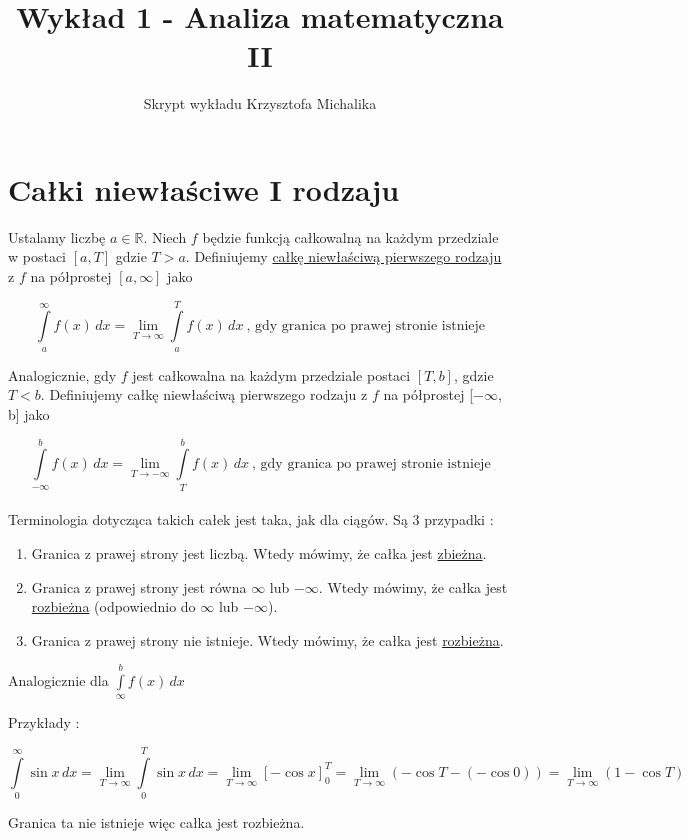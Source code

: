 \documentclass[12pt]{article}
\author{Skrypt wykładu Krzysztofa Michalika}
\title{Wykład 1 - Analiza matematyczna II}
\begin{document}
\maketitle

\section{Całki niewłaściwe I rodzaju}

Ustalamy liczbę $a \in \mathbb{R}$. Niech $f$ będzie funkcją całkowalną na każdym przedziale \linebreak w postaci $[a, T]$
gdzie $T > a$. Definiujemy \underline{całkę niewłaściwą pierwszego rodzaju} z $f$ na półprostej $[a, \infty]$ jako

$$ \int\limits_{a}^{\infty} f(x) \,dx = \lim_{T \to \infty} \int\limits_{a}^{T} f(x) \,dx \ \text{,  gdy granica po prawej stronie istnieje} $$

Analogicznie, gdy $f$ jest całkowalna na każdym przedziale postaci $[T, b]$, gdzie $T < b$. Definiujemy całkę niewłaściwą
pierwszego rodzaju z $f$ na półprostej [$-\infty$, b] jako

$$ \int\limits_{-\infty}^{b} f(x) \,dx = \lim_{T \to -\infty} \int\limits_{T}^{b} f(x) \,dx \ \text{,  gdy granica po prawej stronie istnieje} $$\\

Terminologia dotycząca takich całek jest taka, jak dla ciągów. Są 3 przypadki :

\begin{enumerate}
    \item Granica z prawej strony jest liczbą. Wtedy mówimy, że całka jest \underline{zbieżna}.
    \item Granica z prawej strony jest równa $\infty$ lub $-\infty$. Wtedy mówimy, że całka jest \underline{rozbieżna} (odpowiednio do $\infty$ lub $-\infty$).
    \item Granica z prawej strony nie istnieje. Wtedy mówimy, że całka jest \underline{rozbieżna}.
\end{enumerate}

Analogicznie dla $ \int\limits_{\infty}^{b} f(x)\,dx $

Przykłady :

$$ \int\limits_{0}^{\infty} \sin x \,dx = \lim_{T \to \infty} \int\limits_{0}^{T} \sin x \,dx = 
\lim_{T \to \infty} [-\cos x]_0^T = \lim_{T \to \infty} (-\cos T - (- \cos 0)) = \lim_{T \to \infty} (1 - \cos T) $$

Granica ta nie istnieje więc całka jest rozbieżna. \\
\end{document}
